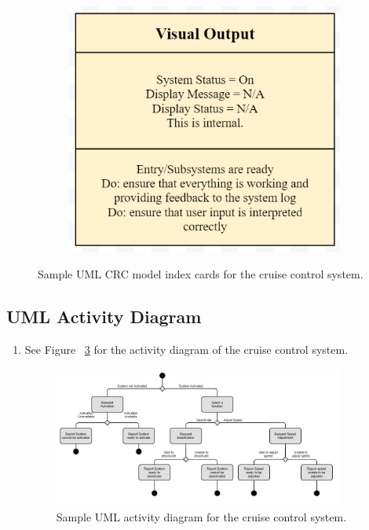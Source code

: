 \documentclass[preprint,11pt,3p]{article}
\begin{document}
\begin{enumerate}
\begin{figure}[H]
\begin{subfigure}{.3\textwidth}
				\includegraphics[width=.8\linewidth]{images/visualoutputindex.PNG}
				\label{fig:sub3}
			\end{subfigure}
			\caption{Sample UML CRC model index cards for the cruise control system.}
			\label{fig:indexUML}
		\end{figure}
\end{enumerate}

\subsection{UML Activity Diagram}
\begin{enumerate}
	\item See Figure ~\ref{fig:activityUML} for the activity diagram of the cruise control system.
		\begin{figure}[H]
			\includegraphics[width=0.9\textwidth]{images/activityUML.jpg}
			\caption{Sample UML activity diagram for the cruise control system.}
			\label{fig:activityUML}
		\end{figure} 
\end{enumerate}
\end{document}

